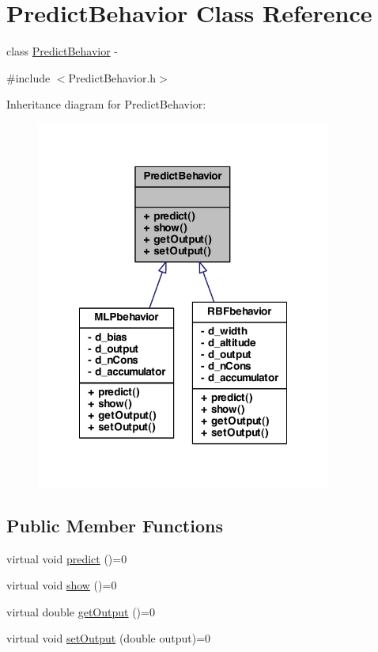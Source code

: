 \hypertarget{class_predict_behavior}{
\section{PredictBehavior Class Reference}
\label{class_predict_behavior}
}


class \hyperlink{class_predict_behavior}{PredictBehavior} -\/  




{\ttfamily \#include $<$PredictBehavior.h$>$}



Inheritance diagram for PredictBehavior:
\nopagebreak
\begin{figure}[H]
\begin{center}
\leavevmode
\includegraphics[width=275pt]{class_predict_behavior__inherit__graph}
\end{center}
\end{figure}
\subsection*{Public Member Functions}
\begin{DoxyCompactItemize}
\item 
virtual void \hyperlink{class_predict_behavior_a7db41238d6d1dbf60c67cf8575e79885}{predict} ()=0
\item 
virtual void \hyperlink{class_predict_behavior_a9ef84360f73784248d994fa4707c1dde}{show} ()=0
\item 
virtual double \hyperlink{class_predict_behavior_a8d44bbfd0e942d4941f77d23fbfe1ad2}{getOutput} ()=0
\item 
virtual void \hyperlink{class_predict_behavior_ad1ac5702c6957ab2037594b5e4a7cf85}{setOutput} (double output)=0
\end{DoxyCompactItemize}


